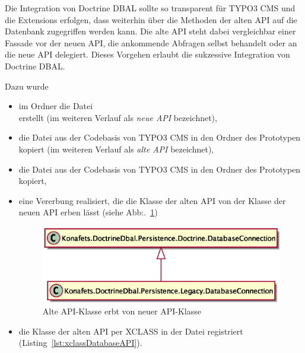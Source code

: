 Die Integration von Doctrine DBAL sollte so transparent für TYPO3 CMS und die Extensions erfolgen, dass weiterhin über die Methoden der alten API auf die Datenbank zugegriffen werden kann. Die alte API steht dabei vergleichbar einer Fassade vor der neuen API, die ankommende Abfragen selbst behandelt oder an die neue API delegiert. Dieses Vorgehen erlaubt die sukzessive Integration von Doctrine DBAL.

Dazu wurde

\begin{itemize}
	\item im Ordner  die Datei\\  erstellt (im weiteren Verlauf als \textit{neue API} bezeichnet),
	\item die Datei  aus der Codebasis von TYPO3 CMS in den Ordner  des Prototypen kopiert (im weiteren Verlauf als \textit{alte API} bezeichnet),
	\item die Datei  aus der Codebasis von TYPO3 CMS in den Ordner  des Prototypen kopiert,
	\item eine Vererbung realisiert, die die Klasse der alten API von der Klasse der neuen API erben lässt (siehe Abb:.~\ref{fig:oldAPIextendsNewAPI})

\begin{figure}[H]
    \centering
    \includegraphics[scale=0.5]{gfx/uml/NewAPI/OldDatabaseConnectionExtentsFromNewAPI.eps}
    \caption{Alte API-Klasse erbt von neuer API-Klasse}
    \label{fig:oldAPIextendsNewAPI}
\end{figure}
	\item die Klasse der alten API per XCLASS in der Datei  registriert (Listing~\ref{lst:xclassDatabaseAPI}).
\end{itemize}


